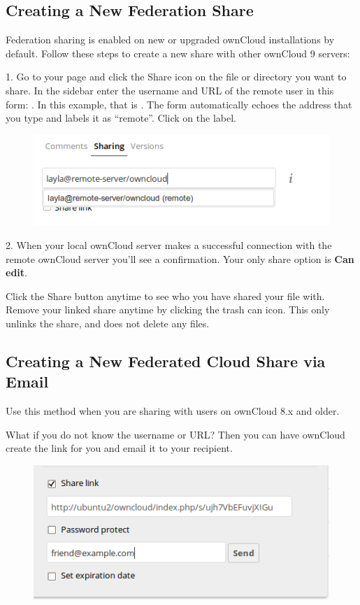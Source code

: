 \documentclass[letterpaper,10pt,english]{sphinxmanual}
\begin{document}
\subsection{Creating a New Federation Share}
\label{files/federated_cloud_sharing:creating-a-new-federation-share}
Federation sharing is enabled on new or upgraded ownCloud installations
by default. Follow these steps to create a new share with other ownCloud 9 servers:

1. Go to your  page and click the Share icon on the file or directory
you want to share. In the sidebar enter the username and URL of the remote user
in this form: . In this example, that is
. The form automatically echoes the address
that you type and labels it as ``remote''. Click on the label.
\begin{figure}[htbp]
\centering

\includegraphics{direct-share-1.png}
\end{figure}

2. When your local ownCloud server makes a successful connection with the remote
ownCloud server you'll see a confirmation. Your only share option is \textbf{Can
edit}.

Click the Share button anytime to see who you have shared your file with. Remove
your linked share anytime by clicking the trash can icon. This only unlinks the
share, and does not delete any files.


\subsection{Creating a New Federated Cloud Share via Email}
\label{files/federated_cloud_sharing:creating-a-new-federated-cloud-share-via-email}
Use this method when you are sharing with users on ownCloud 8.x and older.

What if you do not know the username or URL? Then you can have ownCloud create
the link for you and email it to your recipient.
\begin{figure}[htbp]
\centering

\includegraphics{create_public_share-6.png}
\end{figure}
\end{document}
